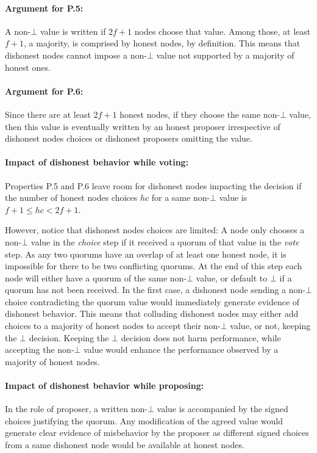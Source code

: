 \paragraph{Argument for P.5:} 
A non-$\bot$ value is written if $2f+1$ nodes choose that value.  Among those, at least $f+1$, a majority, is comprised by honest nodes, by definition.  This means that dishonest nodes cannot impose a non-$\bot$ value not supported by a majority of honest ones.


\paragraph{Argument for P.6:} 
Since there are at least $2f+1$ honest nodes, if they choose the same non-$\bot$ value, 
then this value is eventually written by an honest proposer irrespective of dishonest nodes choices
or dishonest proposers omitting the value.

\paragraph{Impact of dishonest behavior while voting:}

Properties P.5 and P.6 leave room for dishonest nodes impacting the decision if
the number of honest nodes choices $hc$ for a same non-$\bot$ value is $f+1 \leq hc < 2f+1$.

However, notice that dishonest nodes choices are limited: 
A node only chooses a non-$\bot$ value in the \textit{choice} step if it received a quorum of that value in the \textit{vote} step. 
As any two quorums have an overlap of at least one honest node, it is impossible for there to be two conflicting quorums. At the end of this step each node will either have a quorum of the same non-$\bot$ value, or default to $\bot$ if a quorum has not been received.  In the first case, a dishonest node sending a non-$\bot$ choice contradicting the quorum value would immediately generate evidence of dishonest behavior.
%
This means that colluding dishonest nodes may either add choices to a majority of honest nodes 
to accept their non-$\bot$ value, or not, keeping the $\bot$ decision.      
Keeping the $\bot$ decision does not harm performance,  while accepting the non-$\bot$ value
would enhance the performance observed by a majority of honest nodes.

\paragraph{Impact of dishonest behavior while proposing:}
In the role of proposer, a written non-$\bot$ value is accompanied by the signed choices justifying the quorum.
Any modification of the agreed value would generate clear evidence of misbehavior by the proposer as
different signed choices from a same dishonest node would be available at honest nodes.

